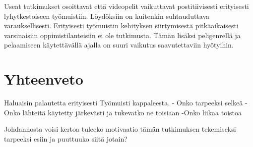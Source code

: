 \documentclass[utf8,bachelor]{gradu3}
\begin{document}
Useat tutkimukset osoittavat että videopelit vaikuttavat postitiivisesti erityisesti lyhytkestoiseen työmuistiin. Löydöksiin on kuitenkin suhtauduttava varauksellisesti. Erityisesti työmuistin kehityksen siirtymisestä pitkäaikaisesti varsinaisiin oppimistilanteisiin ei ole tutkimusta. Tämän lisäksi peligenrellä ja pelaamiseen käytettävällä ajalla on suuri vaikutus saavutettaviin hyötyihin.

\chapter{Yhteenveto}

Haluaisin palautetta erityisesti Työmuisti kappaleesta. 
- Onko tarpeeksi selkeä
-Onko lähteitä käytetty järkevästi ja tukevatko ne toisiaan
-Onko liikaa toistoa

Johdannosta voisi kertoa tuleeko motivaatio tämän tutkimuksen tekemiseksi tarpeeksi esiin ja puuttuuko siitä jotain?
\printbibliography
\end{document}
